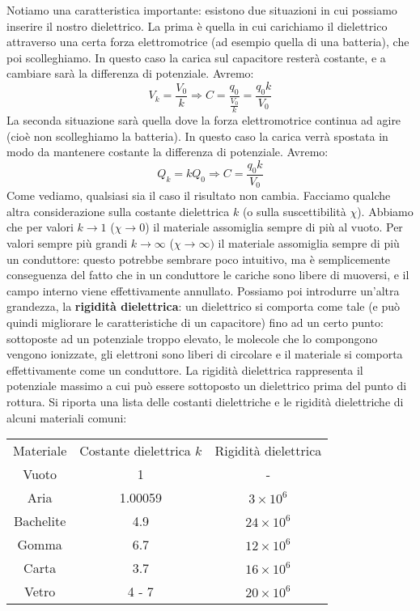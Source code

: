\documentclass[a4paper,12pt]{article}
\begin{document}
Notiamo una caratteristica importante: esistono due situazioni in cui possiamo inserire il nostro dielettrico. La prima è quella in cui carichiamo il dielettrico attraverso una certa forza elettromotrice (ad esempio quella di una batteria), che poi
scolleghiamo. In questo caso la carica sul capacitore resterà costante, e a cambiare sarà la differenza di potenziale. Avremo:
$$ V_k = \frac{V_0}{k} \Rightarrow C = \frac{q_0}{\frac{V_0}{k}} = \frac{q_0 k}{V_0} $$
La seconda situazione sarà quella dove la forza elettromotrice continua ad agire (cioè non scolleghiamo la batteria). In questo caso la carica verrà spostata in modo da mantenere costante la differenza di potenziale. Avremo:
$$ Q_k = kQ_0 \Rightarrow C = \frac{q_0 k}{V_0} $$
Come vediamo, qualsiasi sia il caso il risultato non cambia.
Facciamo qualche altra considerazione sulla costante dielettrica $k$ (o sulla suscettibilità $\chi$). Abbiamo che per valori $k \rightarrow 1$ ($\chi \rightarrow 0$) il materiale assomiglia sempre di più al vuoto. Per valori sempre più grandi
$k \rightarrow \infty$ ($\chi \rightarrow \infty)$ il materiale assomiglia sempre di più un conduttore: questo potrebbe sembrare poco intuitivo, ma è semplicemente conseguenza del fatto che in un conduttore le cariche sono libere di muoversi, e il campo
interno viene effettivamente annullato. Possiamo poi introdurre un'altra grandezza, la \textbf{rigidità dielettrica}: un dielettrico si comporta come tale (e può quindi migliorare le caratteristiche di un capacitore) fino ad un certo punto:
sottoposte ad un potenziale troppo elevato, le molecole che lo compongono vengono ionizzate, gli elettroni sono liberi di circolare e il materiale si comporta effettivamente come un conduttore. La rigidità dielettrica rappresenta il potenziale massimo a cui può essere
sottoposto un dielettrico prima del punto di rottura. Si riporta una lista delle costanti dielettriche e le rigidità
dielettriche di alcuni materiali comuni:
\begin{center}
\begin{tabular}{|c|c|c|}
  Materiale & Costante dielettrica $k$ & Rigidità dielettrica \\
  Vuoto & 1 & - \\
  Aria & 1.00059 & $3\times 10^6$ \\
  Bachelite & 4.9 & $24\times 10^6$ \\
  Gomma & 6.7 & $12\times 10^6$ \\
  Carta & 3.7 & $16\times 10^6$ \\
  Vetro & 4 - 7 & $20\times 10^6$ \\
\end{tabular}
\end{center}
\end{document}

